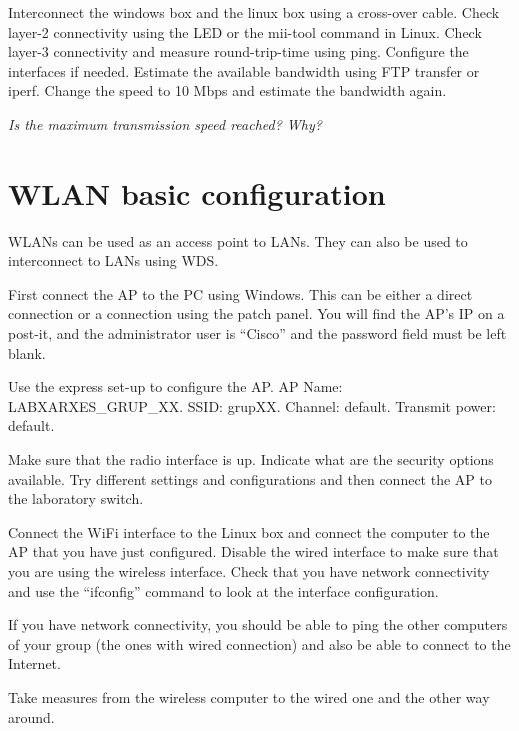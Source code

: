 Interconnect the windows box and the linux box using a cross-over cable.
Check layer-2 connectivity using the LED or the mii-tool command in Linux.
Check layer-3 connectivity and measure round-trip-time using ping. 
Configure the interfaces if needed.
Estimate the available bandwidth using FTP transfer or iperf.
Change the speed to 10 Mbps and estimate the bandwidth again.


\emph{Is the maximum transmission speed reached? Why?}

\section{WLAN basic configuration}

WLANs can be used as an access point to LANs.
They can also be used to interconnect to LANs using WDS.

First connect the AP to the PC using Windows.
This can be either a direct connection or a connection using the patch panel.
You will find the AP's IP on a post-it, and the administrator user is ``Cisco'' and the password field must be left blank.

Use the express set-up to configure the AP.
AP Name: LABXARXES_GRUP_XX.
SSID: grupXX.
Channel: default.
Transmit power: default.

Make sure that the radio interface is up. 
Indicate what are the security options available.
Try different settings and configurations and then connect the AP to the laboratory switch.

Connect the WiFi interface to the Linux box and connect the computer to the AP that you have just configured.
Disable the wired interface to make sure that you are using the wireless interface.
Check that you have network connectivity and use the ``ifconfig'' command to look at the interface configuration.

If you have network connectivity, you should be able to ping the other computers of your group (the ones with wired connection) and also be able to connect to the Internet.

Take measures from the wireless computer to the wired one and the other way around.



